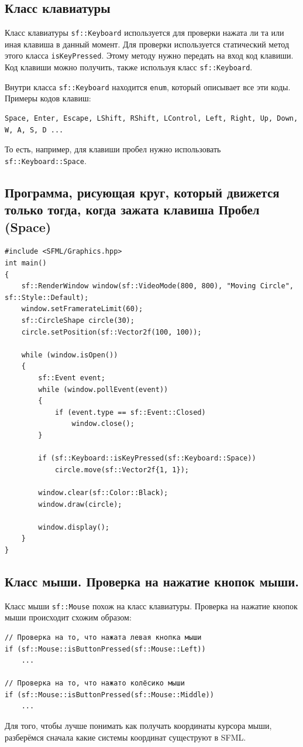 \documentclass{article}
\begin{document}
\subsection*{Класс клавиатуры}
Класс клавиатуры \texttt{sf::Keyboard} используется для проверки нажата ли та или иная клавиша в данный момент. Для проверки используется статический метод этого класса \texttt{isKeyPressed}. Этому методу нужно передать на вход код клавиши. Код клавиши можно получить, также используя класс \texttt{sf::Keyboard}. 

Внутри класса \texttt{sf::Keyboard} находится \texttt{enum}, который описывает все эти коды. Примеры кодов клавиш:
\begin{verbatim}
Space, Enter, Escape, LShift, RShift, LControl, Left, Right, Up, Down, W, A, S, D ...
\end{verbatim}
То есть, например, для клавиши пробел нужно использовать 
\texttt{sf::Keyboard::Space}.

\subsection*{Программа, рисующая круг, который движется только тогда, когда зажата клавиша Пробел (Space)}
\begin{lstlisting}
#include <SFML/Graphics.hpp>
int main()
{
    sf::RenderWindow window(sf::VideoMode(800, 800), "Moving Circle", sf::Style::Default);
    window.setFramerateLimit(60);
    sf::CircleShape circle(30);
    circle.setPosition(sf::Vector2f(100, 100));

    while (window.isOpen())
    {
        sf::Event event;
        while (window.pollEvent(event)) 
        {
            if (event.type == sf::Event::Closed)
                window.close();
        }
        
        if (sf::Keyboard::isKeyPressed(sf::Keyboard::Space))
        	circle.move(sf::Vector2f{1, 1});

        window.clear(sf::Color::Black);
        window.draw(circle);

        window.display();
    }
}
\end{lstlisting}

\subsection*{Класс мыши. Проверка на нажатие кнопок мыши.}
Класс мыши \texttt{sf::Mouse} похож на класс клавиатуры. Проверка на нажатие кнопок мыши происходит схожим образом:
\begin{lstlisting}
// Проверка на то, что нажата левая кнопка мыши
if (sf::Mouse::isButtonPressed(sf::Mouse::Left))
	...

// Проверка на то, что нажато колёсико мыши
if (sf::Mouse::isButtonPressed(sf::Mouse::Middle))
	...
\end{lstlisting}
Для того, чтобы лучше понимать как получать координаты курсора мыши, разберёмся сначала какие системы координат сущеструют в SFML.
\end{document}
